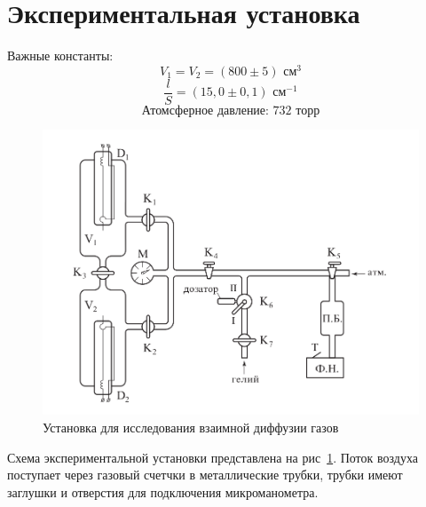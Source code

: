 \documentclass[11pt,a4paper]{article}
\begin{document}
\section*{Экспериментальная установка}
Важные константы:\\
  \[V_1 = V_2 = (800 \pm 5)\text{ см}^3\]
  \[ \frac{l}{S} = (15,0 \pm 0,1)\text{ см}^{-1}\]
  \[\text{Атомсферное давление: 732 торр}\]
\begin{figure}[h]
  \includegraphics*[width=\textwidth]{ustanovka.png}
  \caption{Установка для исследования взаимной диффузии газов}
  \label{fig:ust}
\end{figure}

Схема экспериментальной установки представлена на рис~\ref{fig:ust}.
Поток воздуха поступает через газовый счетчки в металлические трубки,
трубки имеют заглушки и отверстия для подключения микроманометра.
\end{document}
